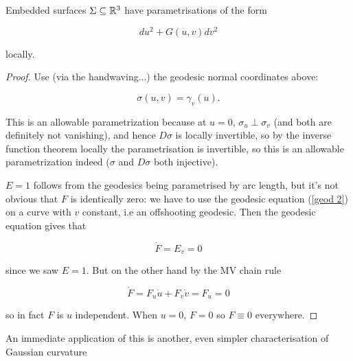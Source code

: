 \documentclass[11pt]{scrartcl}
\begin{document}
\begin{proposition}
Embedded surfaces $\Sigma \subseteq \mathbb R^3$ have parametrisations of the form

\begin{equation}
    du^2 + G(u,v)dv^2
\end{equation}

locally.

\begin{proof}
Use (via the handwaving...) the geodesic normal coordinates above: 

\begin{equation}
    \sigma(u,v) = \gamma_v(u).
\end{equation}


This is an allowable parametrization because at $u=0$, $\sigma_u \perp \sigma_v$ (and both are definitely not vanishing), and hence $D \sigma$ is locally invertible, so by the inverse function theorem locally the parametrisation is invertible, so this is an allowable parametrization indeed ($\sigma$ and $D \sigma$ both injective).


$E=1$ follows from the geodesics being parametrised by arc length, but it's not obvious that $F$ is identically zero: we have to use the geodesic equation (\ref{geod 2}) on a curve with $v$ constant, i.e an offshooting geodesic. Then the geodesic equation gives that 

\begin{equation}
    \dot{F} = E_v = 0
\end{equation}

since we saw $E=1$. But on the other hand by the MV chain rule

\begin{equation}
    \dot{F} = F_u \dot{u} + F_v\dot{v} = F_u = 0
\end{equation}

so in fact $F$ is $u$ independent. When $u=0$, $F=0$ so $F \equiv 0$ everywhere.
\end{proof}
\end{proposition}


An immediate application of this is another, even simpler characterisation of Gaussian curvature
\end{document}
